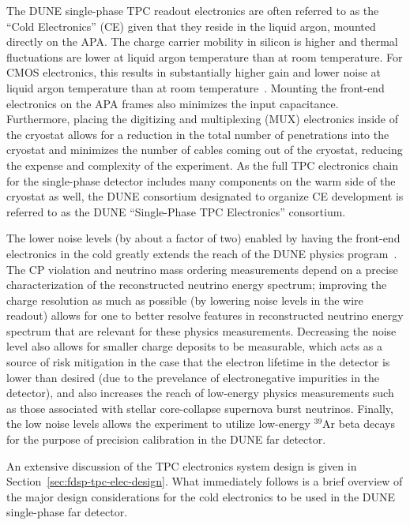 The DUNE single-phase TPC readout electronics are often referred to as the ``Cold Electronics'' (CE) given that they reside in the liquid argon, mounted directly on the APA.  The charge carrier mobility in silicon is higher and thermal fluctuations are lower at liquid argon temperature than at room temperature.  For CMOS electronics, this results in substantially higher gain and lower noise at liquid argon temperature than at room temperature~\cite{LArCMOS}.  Mounting the front-end electronics on the APA frames also minimizes the input capacitance.  Furthermore, placing the digitizing and multiplexing (MUX) electronics inside of the cryostat allows for a reduction in the total number of penetrations into the cryostat and minimizes the number of cables coming out of the cryostat, reducing the expense and complexity of the experiment.  As the full TPC electronics chain for the single-phase detector includes many components on the warm side of the cryostat as well, the DUNE consortium designated to organize CE development is referred to as the DUNE ``Single-Phase TPC Electronics'' consortium.

The lower noise levels (by about a factor of two) enabled by having the front-end electronics in the cold greatly extends the reach of the DUNE physics program~\cite{LArCMOS}.  The CP violation and neutrino mass ordering measurements depend on a precise characterization of the reconstructed neutrino energy spectrum; improving the charge resolution as much as possible (by lowering noise levels in the wire readout) allows for one to better resolve features in reconstructed neutrino energy spectrum that are relevant for these physics measurements.  Decreasing the noise level also allows for smaller charge deposits to be measurable, which acts as a source of risk mitigation in the case that the electron lifetime in the detector is lower than desired (due to the prevelance of electronegative impurities in the detector), and also increases the reach of low-energy physics measurements such as those associated with stellar core-collapse supernova burst neutrinos.  Finally, the low noise levels allows the experiment to utilize low-energy $\mathrm{{}^{39}Ar}$ beta decays for the purpose of precision calibration in the DUNE far detector.

An extensive discussion of the TPC electronics system design is given in Section~\ref{sec:fdsp-tpc-elec-design}.  What immediately follows is a brief overview of the major design considerations for the cold electronics to be used in the DUNE single-phase far detector.
